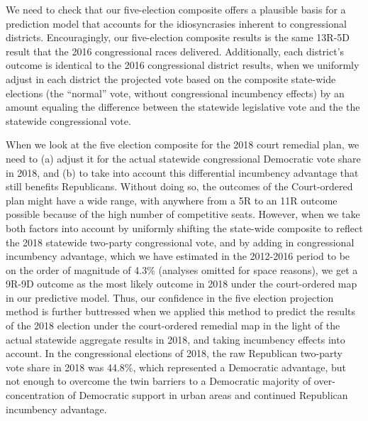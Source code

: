 \par
    We need to check that our five-election composite offers a plausible basis for a prediction model that accounts for the idiosyncrasies inherent to congressional districts. Encouragingly, our five-election composite results is the same 13R-5D result that the 2016 congressional races delivered. Additionally, each district’s outcome is identical to the 2016 congressional district results, when we uniformly adjust in each district the projected vote based on the composite state-wide elections (the ``normal'' vote, without  congressional incumbency effects) by an amount equaling the difference between the statewide legislative vote and the the statewide congressional vote.
\par
    When we look at the five election composite for the 2018 court remedial plan, we need to (a) adjust it for the actual statewide congressional Democratic vote share in 2018, and (b) to take into account this differential incumbency advantage that still benefits Republicans. Without doing so, the outcomes of the Court-ordered plan might have a wide range, with anywhere from a 5R to an 11R outcome possible because of the high number of competitive seats. However, when we take both factors into account by uniformly shifting the state-wide composite to reflect the 2018 statewide two-party congressional vote, and by adding in congressional incumbency advantage, which we have estimated in the 2012-2016 period to be on the order of magnitude of 4.3\% (analyses omitted for space reasons), we get a 9R-9D outcome as the most likely outcome in 2018 under the court-ordered map in our predictive model. Thus, our confidence in the five election projection method is further buttressed when we applied this method to predict the results of the 2018 election under the court-ordered remedial map in the light of the actual statewide aggregate results in 2018, and taking incumbency effects into account. In the congressional elections of 2018, the raw Republican two-party vote share in 2018 was 44.8\%, which represented a Democratic advantage, but not enough to overcome the twin barriers to a Democratic majority of over-concentration of Democratic support in urban areas and continued Republican incumbency advantage.
